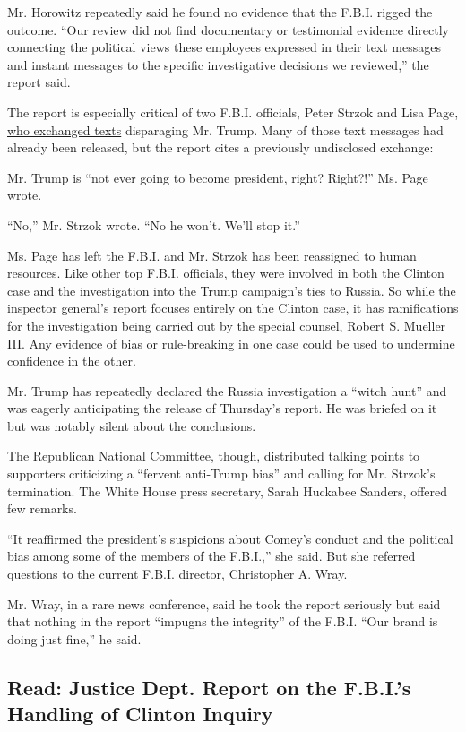 Mr. Horowitz repeatedly said he found no evidence that the F.B.I. rigged
the outcome. ``Our review did not find documentary or testimonial
evidence directly connecting the political views these employees
expressed in their text messages and instant messages to the specific
investigative decisions we reviewed,'' the report said.

The report is especially critical of two F.B.I. officials, Peter Strzok
and Lisa Page,
\href{https://www.nytimes.com/2017/12/12/us/fbi-trump-russia.html}{who
exchanged texts} disparaging Mr. Trump. Many of those text messages had
already been released, but the report cites a previously undisclosed
exchange:

Mr. Trump is ``not ever going to become president, right? Right?!'' Ms.
Page wrote.

``No,'' Mr. Strzok wrote. ``No he won't. We'll stop it.''

Ms. Page has left the F.B.I. and Mr. Strzok has been reassigned to human
resources. Like other top F.B.I. officials, they were involved in both
the Clinton case and the investigation into the Trump campaign's ties to
Russia. So while the inspector general's report focuses entirely on the
Clinton case, it has ramifications for the investigation being carried
out by the special counsel, Robert S. Mueller III. Any evidence of bias
or rule-breaking in one case could be used to undermine confidence in
the other.

Mr. Trump has repeatedly declared the Russia investigation a ``witch
hunt'' and was eagerly anticipating the release of Thursday's report. He
was briefed on it but was notably silent about the conclusions.

The Republican National Committee, though, distributed talking points to
supporters criticizing a ``fervent anti-Trump bias'' and calling for Mr.
Strzok's termination. The White House press secretary, Sarah Huckabee
Sanders, offered few remarks.

``It reaffirmed the president's suspicions about Comey's conduct and the
political bias among some of the members of the F.B.I.,'' she said. But
she referred questions to the current F.B.I. director, Christopher A.
Wray.

Mr. Wray, in a rare news conference, said he took the report seriously
but said that nothing in the report ``impugns the integrity'' of the
F.B.I. ``Our brand is doing just fine,'' he said.

\hypertarget{read-justice-dept-report-on-the-fbis-handling-of-clinton-inquiry}{%
\subsection{Read: Justice Dept. Report on the F.B.I.'s Handling of
Clinton
Inquiry}\label{read-justice-dept-report-on-the-fbis-handling-of-clinton-inquiry}}


